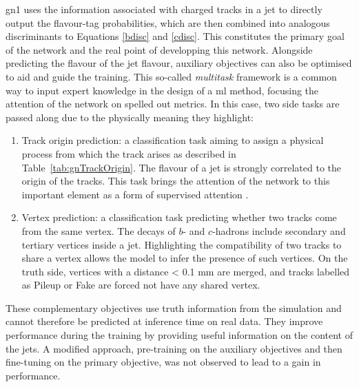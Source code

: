 \gls{gn1} uses the information associated with charged tracks in a jet to directly output the flavour-tag probabilities, which are then combined into analogous discriminants to Equations \ref{bdisc} and \ref{cdisc}. This constitutes the primary goal of the network and the real point of developping this network. Alongside predicting the flavour of the jet flavour, auxiliary objectives can also be optimised to aid and guide the training. This so-called \textit{multitask} framework is a common way to input expert knowledge in the design of a \gls{ml} method, focusing the attention of the network on spelled out metrics. In this case, two side tasks are passed along due to the physically meaning they highlight:
\begin{enumerate}
\item Track origin prediction: a classification task aiming to assign a physical process from which the track arises as described in Table~\ref{tab:gnTrackOrigin}. The flavour of a jet is strongly correlated to the origin of the tracks. This task brings the attention of the network to this important element as a form of supervised attention \cite{hwang2021selfsupervised}.
\item Vertex prediction: a classification task predicting whether two tracks come from the same vertex. The decays of $b$- and $c$-hadrons include secondary and tertiary vertices inside a jet. Highlighting the compatibility of two tracks to share  a vertex allows the model to infer the presence of such vertices. On the truth side, vertices with a distance < 0.1 mm are merged, and tracks labelled as Pileup or Fake are forced not have any shared vertex.
\end{enumerate}
These complementary objectives use truth information from the simulation and cannot therefore be predicted at inference time on real data. They improve performance during the training by providing useful information on the content of the jets.  A modified approach, pre-training on the auxiliary objectives and then fine-tuning on the primary objective, was not observed to lead to a gain in performance. \\

